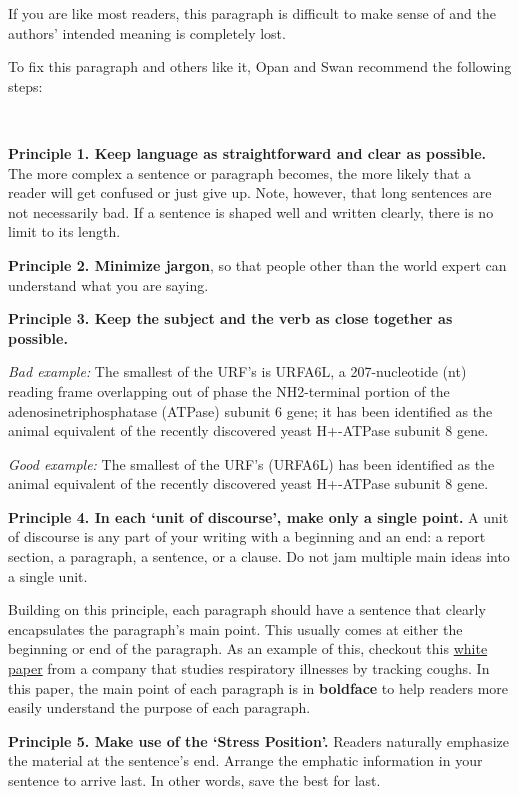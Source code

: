 \documentclass[
]{book}
\begin{document}
If you are like most readers, this paragraph is difficult to make sense of and the authors' intended meaning is completely lost.

To fix this paragraph and others like it, Opan and Swan recommend the following steps:

~

\textbf{Principle 1. Keep language as straightforward and clear as possible.} The more complex a sentence or paragraph becomes, the more likely that a reader will get confused or just give up. Note, however, that long sentences are not necessarily bad. If a sentence is shaped well and written clearly, there is no limit to its length.

\textbf{Principle 2. Minimize jargon}, so that people other than the world expert can understand what you are saying.

\textbf{Principle 3. Keep the subject and the verb as close together as possible.}

\emph{Bad example:} The smallest of the URF's is URFA6L, a 207-nucleotide (nt) reading frame overlapping out of phase the NH2-terminal portion of the adenosinetriphosphatase (ATPase) subunit 6 gene; it has been identified as the animal equivalent of the recently discovered yeast H+-ATPase subunit 8 gene.

\emph{Good example:} The smallest of the URF's (URFA6L) has been identified as the animal equivalent of the recently discovered yeast H+-ATPase subunit 8 gene.

\textbf{Principle 4. In each `unit of discourse', make only a single point.} A unit of discourse is any part of your writing with a beginning and an end: a report section, a paragraph, a sentence, or a clause. Do not jam multiple main ideas into a single unit.

Building on this principle, each paragraph should have a sentence that clearly encapsulates the paragraph's main point. This usually comes at either the beginning or end of the paragraph. As an example of this, checkout this \href{https://uploads-ssl.webflow.com/601331581ba868154325e525/604287b91aab4e5c89de8e0e_Hyfe\%20Smart\%20Cough\%20Monitoring.pdf}{white paper} from a company that studies respiratory illnesses by tracking coughs. In this paper, the main point of each paragraph is in \textbf{boldface} to help readers more easily understand the purpose of each paragraph.

\textbf{Principle 5. Make use of the `Stress Position'.} Readers naturally emphasize the material at the sentence's end. Arrange the emphatic information in your sentence to arrive last. In other words, save the best for last.
\end{document}
